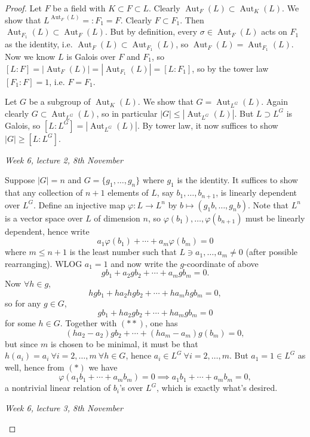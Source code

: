 \documentclass{article}
\newcommand{\Aut}{\operatorname{Aut}}
\theoremstyle{definition}
\begin{document}
\begin{proof}
Let $F$ be a field with $K\subset F\subset L$. Clearly $\Aut_F(L)\subset\Aut_K(L)$. We show that $L^{\Aut_F(L)}=:F_1=F$. Clearly $F\subset F_1$. Then $\Aut_{F_1}(L)\subset\Aut_F(L)$. But by definition, every $\sigma\in\Aut_F(L)$ acts on $F_1$ as the identity, i.e. $\Aut_F(L)\subset\Aut_{F_1}(L)$, so $\Aut_F(L)=\Aut_{F_1}(L)$. Now we know $L$ is Galois over $F$ and $F_1$, so $[L:F]=|\!\Aut_F(L)|=|\!\Aut_{F_1}(L)|=[L:F_1]$, so by the tower law $[F_1:F]=1$, i.e. $F=F_1$.

Let $G$ be a subgroup of $\Aut_K(L)$. We show that $G=\Aut_{L^G}(L)$. Again clearly $G\subset\Aut_{L^G}(L)$, so in particular $|G|\leq |\!\Aut_{L^G}(L)|$. But $L\supset L^G$ is Galois, so $[L:L^G]=|\!\Aut_{L^G}(L)|$. By tower law, it now suffices to show $|G|\geq [L:L^G]$.

\begin{flushright}
\textit{Week 6, lecture 2, 8th November}
\end{flushright}

Suppose $|G|=n$ and $G=\{g_1,\ldots,g_n\}$ where $g_1$ is the identity. It suffices to show that any collection of $n+1$ elements of $L$, say $b_1,\ldots,b_{n+1}$, is linearly dependent over $L^G$. Define an injective map $\varphi:L\rightarrow L^n$ by $b\mapsto (g_1b,\ldots,g_nb)$. Note that $L^n$ is a vector space over $L$ of dimension $n$, so $\varphi(b_1),\ldots,\varphi(b_{n+1})$ must be linearly dependent, hence write
\[
\tag{\ast}
a_1\varphi(b_1)+\cdots+a_m\varphi(b_m)=0
\]
where $m\leq n+1$ is the least number such that $L\ni a_1,\ldots,a_m\neq 0$ (after possible rearranging). WLOG $a_1=1$ and now write the $g$-coordinate of above
\[
\tag{\ast\ast}
gb_1+a_2gb_2+\cdots+a_mgb_m=0.
\]
Now $\forall h\in g$,
\[
hgb_1+ha_2hgb_2+\cdots+ha_mhgb_m=0,
\]
so for any $g\in G$,
\[
gb_1+ha_2gb_2+\cdots+ha_mgb_m=0
\]
for some $h\in G$. Together with $(\ast\ast)$, one has
\[
(ha_2-a_2)gb_2+\cdots+(ha_m-a_m)g(b_m)=0,
\]
but since $m$ is chosen to be minimal, it must be that $h(a_i)=a_i \ \forall i=2,\ldots,m \ \forall h\in G$, hence $a_i\in L^G \ \forall i=2,\ldots,m$. But $a_1=1\in L^G$ as well, hence from $(\ast)$ we have
\[
\varphi(a_1b_1+\cdots+a_mb_m)=0\implies a_1b_1+\cdots+a_mb_m=0,
\]
a nontrivial linear relation of $b_i$'s over $L^G$, which is exactly what's desired.

\begin{flushright}
\textit{Week 6, lecture 3, 8th November}
\end{flushright}


\end{proof}
\end{document}
